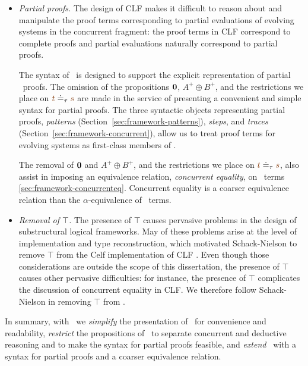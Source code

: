 \begin{itemize}
\item{\it Partial proofs.} The design of CLF makes it difficult to
  reason about and manipulate the proof terms corresponding to partial
  evaluations of evolving systems in the concurrent fragment: the proof
  terms in CLF correspond to complete proofs and partial evaluations
  naturally correspond to partial proofs.

  The syntax of \sls~is designed to support the explicit
  representation of partial \ollll~proofs. The omission of the
  propositions $\mathbf{0}$, $A^+ \oplus B^+$, and the restrictions we
  place on $\lf{t} \doteq_\tau \lf{s}$ are made in the service of
  presenting a convenient and simple syntax for partial proofs. The
  three syntactic objects representing partial proofs, {\it patterns}
  (Section~\ref{sec:framework-patterns}), {\it steps}, and {\it
    traces} (Section~\ref{sec:framework-concurrent}), allow us to
  treat proof terms for evolving systems as first-class members of
  \sls.

  The removal of $\mathbf{0}$ and $A^+ \oplus B^+$, and the restrictions we
  place on $\lf{t} \doteq_\tau \lf{s}$, also assist in imposing an
  equivalence relation, {\it concurrent equality}, on \sls~terms
  \ref{sec:framework-concurrenteq}. Concurrent equality is a coarser
  equivalence relation than the $\alpha$-equivalence of \ollll~terms.

\item{\it Removal of $\top$.} The presence of $\top$ causes pervasive
  problems in the design of substructural logical frameworks. May of
  these problems arise at the level of implementation and type
  reconstruction, which motivated Schack-Nielson to remove $\top$ from
  the Celf implementation of CLF
  \cite{schacknielsen11implementing}. Even though those considerations
  are outside the scope of this dissertation, the presence of $\top$ causes
  other pervasive difficulties: for instance, the presence of $\top$
  complicates the discussion of concurrent equality in CLF. We therefore
  follow Schack-Nielson in removing $\top$ from \sls.

\end{itemize}
\smallskip
\noindent
In summary, with \sls~we {\it simplify} the presentation of \ollll~for
convenience and readability, {\it restrict} the propositions of
\ollll~to separate concurrent and deductive reasoning and to make the
syntax for partial proofs feasible, and {\it extend} \ollll~with a
syntax for partial proofs and a coarser equivalence relation.

